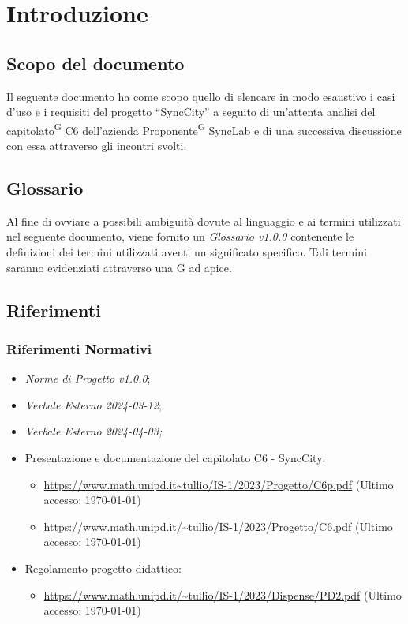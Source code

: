 \documentclass[8pt]{article}
\newcommand{\glossterm}[1]{#1\textsuperscript{G}} %
\begin{document}
\section{Introduzione}
\subsection{Scopo del documento}
Il seguente documento ha come scopo quello di elencare in modo esaustivo i casi d'uso e i requisiti
del progetto ``SyncCity'' a seguito di un'attenta analisi del \glossterm{capitolato} C6 dell'azienda \glossterm{Proponente} SyncLab e di una successiva discussione con essa attraverso gli incontri svolti.
\subsection{Glossario}
Al fine di ovviare a possibili ambiguità dovute al linguaggio e ai termini utilizzati nel seguente
documento, viene fornito un \textit{Glossario v1.0.0} contenente le definizioni dei termini utilizzati aventi un significato specifico. Tali termini saranno evidenziati attraverso una G ad apice.
\subsection{Riferimenti}
\subsubsection{Riferimenti Normativi}
\begin{itemize}
	\setlength\itemsep{0em}
	\item \textit{Norme di Progetto v1.0.0};	
	\item \textit{Verbale Esterno 2024-03-12};
	\item \textit{Verbale Esterno 2024-04-03;}
  \item Presentazione e documentazione del capitolato C6 - SyncCity:
	\begin{itemize}
		\item \href{https://www.math.unipd.it/~tullio/IS-1/2023/Progetto/C6p.pdf}{https://www.math.unipd.it\textasciitilde{}tullio/IS-1/2023/Progetto/C6p.pdf} (Ultimo accesso: \today)
		\item \href{https://www.math.unipd.it/~tullio/IS-1/2023/Progetto/C6.pdf}{https://www.math.unipd.it/\textasciitilde{}tullio/IS-1/2023/Progetto/C6.pdf} (Ultimo accesso: \today)
\end{itemize}
	\item Regolamento progetto didattico: 
      \begin{itemize}
          \item \href{https://www.math.unipd.it/~tullio/IS-1/2023/Dispense/PD2.pdf}{https://www.math.unipd.it/\textasciitilde{}tullio/IS-1/2023/Dispense/PD2.pdf} (Ultimo accesso: \today)
    \end{itemize}
\end{itemize}
\end{document}
